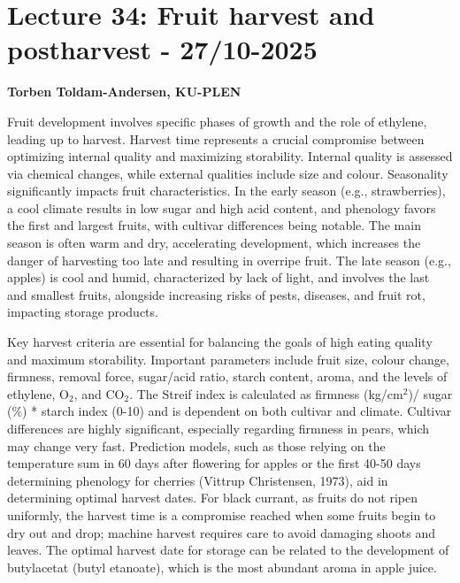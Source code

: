 \section{Lecture 34: Fruit harvest and postharvest - 27/10-2025}
\textbf{Torben Toldam-Andersen, KU-PLEN}

\vspace{1em}
Fruit development involves specific phases of growth and the role of ethylene, leading up to harvest. Harvest time represents a crucial compromise between optimizing internal quality and maximizing storability. Internal quality is assessed via chemical changes, while external qualities include size and colour. Seasonality significantly impacts fruit characteristics. In the early season (e.g., strawberries), a cool climate results in low sugar and high acid content, and phenology favors the first and largest fruits, with cultivar differences being notable. The main season is often warm and dry, accelerating development, which increases the danger of harvesting too late and resulting in overripe fruit. The late season (e.g., apples) is cool and humid, characterized by lack of light, and involves the last and smallest fruits, alongside increasing risks of pests, diseases, and fruit rot, impacting storage products.

\vspace{0.5em}
Key harvest criteria are essential for balancing the goals of high eating quality and maximum storability. Important parameters include fruit size, colour change, firmness, removal force, sugar/acid ratio, starch content, aroma, and the levels of ethylene, O$_2$, and CO$_2$. The Streif index is calculated as firmness (kg/cm$^2$)/ sugar (\%) * starch index (0-10) and is dependent on both cultivar and climate. Cultivar differences are highly significant, especially regarding firmness in pears, which may change very fast. Prediction models, such as those relying on the temperature sum in 60 days after flowering for apples or the first 40-50 days determining phenology for cherries (Vittrup Christensen, 1973), aid in determining optimal harvest dates. For black currant, as fruits do not ripen uniformly, the harvest time is a compromise reached when some fruits begin to dry out and drop; machine harvest requires care to avoid damaging shoots and leaves. The optimal harvest date for storage can be related to the development of butylacetat (butyl etanoate), which is the most abundant aroma in apple juice.

